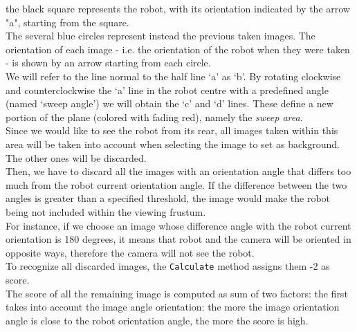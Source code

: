the black square represents the robot, with its orientation 
indicated by the arrow "a", starting from the square.
\\
The several blue circles represent instead the previous 
taken images. The orientation of each image - i.e. the 
orientation of the robot when they were taken - 
is shown by an arrow starting from each circle.
\\
We will refer to the line normal to the half line `a' as `b'. 
By rotating clockwise and counterclockwise the `a' line in 
the robot centre with a predefined angle (named `sweep angle')
we will obtain the `c' and `d' lines. These define a new 
portion of the plane (colored with fading red), namely the 
\textit{sweep area}.
\\
Since we would like to see the robot from its rear, 
all images taken within this area will be taken into account
when selecting the image to set as background.
The other ones will be discarded.
\\
Then, we have to discard all the images with an orientation 
angle that differs too much from the robot current orientation angle. 
If the difference between the two angles is greater than a specified 
threshold, the image would make the robot being not included 
within the viewing frustum.
\\
For instance, if we choose an image whose difference angle with 
the robot current orientation is 180 degrees, it means that robot and 
the camera will be oriented in opposite ways, 
therefore the camera will not see the robot.
\\
To recognize all discarded images, the \texttt{Calculate} method 
assigns them -2 as score.
\\
The score of all the remaining image is computed as sum 
of two factors:
the first takes into account the image angle orientation: 
the more the image orientation angle is close to the 
robot orientation angle, the more the score is high.

